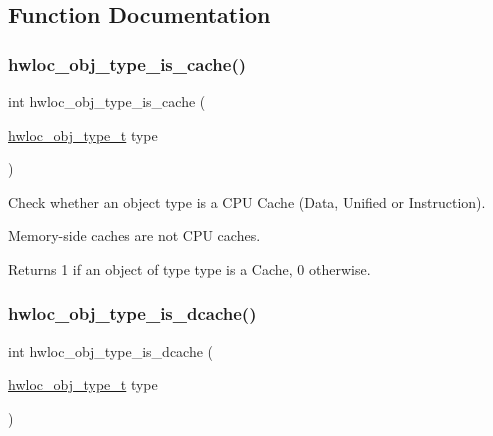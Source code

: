 \subsection{Function Documentation}
\mbox{\label{a00198_ga2ed589bea28711e80b92066510a5607d}} 
\subsubsection{\texorpdfstring{hwloc\+\_\+obj\+\_\+type\+\_\+is\+\_\+cache()}{hwloc\_obj\_type\_is\_cache()}}
{\footnotesize\ttfamily int hwloc\+\_\+obj\+\_\+type\+\_\+is\+\_\+cache (\begin{DoxyParamCaption}\item[{\hyperlink{a00184_gacd37bb612667dc437d66bfb175a8dc55}{hwloc\+\_\+obj\+\_\+type\+\_\+t}}]{type }\end{DoxyParamCaption})}



Check whether an object type is a C\+PU Cache (Data, Unified or Instruction). 

Memory-\/side caches are not C\+PU caches.

\begin{DoxyReturn}{Returns}
1 if an object of type {\ttfamily type} is a Cache, 0 otherwise. 
\end{DoxyReturn}
\mbox{\label{a00198_ga395e48cd221d107e5891689624e1aec4}} 
\subsubsection{\texorpdfstring{hwloc\+\_\+obj\+\_\+type\+\_\+is\+\_\+dcache()}{hwloc\_obj\_type\_is\_dcache()}}
{\footnotesize\ttfamily int hwloc\+\_\+obj\+\_\+type\+\_\+is\+\_\+dcache (\begin{DoxyParamCaption}\item[{\hyperlink{a00184_gacd37bb612667dc437d66bfb175a8dc55}{hwloc\+\_\+obj\+\_\+type\+\_\+t}}]{type }\end{DoxyParamCaption})}



